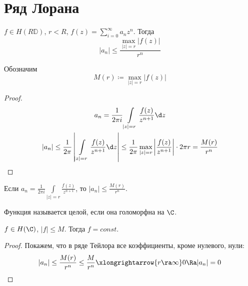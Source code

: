 \section{Ряд Лорана}

\begin{theorem}
	$f \in H(R\mathbb D)$, $r < R$, $f(z) = \sum_{i=0}^\infty a_nz^n$.
	Тогда
	\[ |a_n| \le \frac{\max_{|z| = r} |f(z)|}{r^n} \]
\end{theorem}

Обозначим
\[ M(r) \coloneqq \max_{|z| = r} |f(z)| \]
\begin{proof}
	\begin{gather*}
		a_n = \frac1{2\pi i} \int\limits_{|z| = r} \frac{f(z)}{z^{n+1}} \d z \\
		|a_n|
		\le \frac1{2\pi} \left| \int\limits_{|z| = r} \frac{f(z)}{z^{n+1}} \d z\right|
		\le \frac1{2\pi} \max_{|z| = r} \left| \frac{f(z)}{z^{n+1}}\right| \cdot 2\pi r = \frac{M(r)}{r^n}
	\end{gather*}
\end{proof}

\begin{Rem}
	Если $a_n = \frac1{2\pi i} \int\limits_{|z| = r} \frac{f(z)}{z^{n+1}}$, то $|a_n| \le \frac{M(r)}{r^n}$.
\end{Rem}

\begin{Def}
	Функция называется целой, если она голоморфна на $\C$.
\end{Def}

\begin{theorem}[Лиувилля]
	$f \in H(\C)$, $|f| \le M$.
	Тогда $f = const$.
\end{theorem}
\begin{proof}
	Покажем, что в ряде Тейлора все коэффициенты, кроме нулевого, нули:
	\[ |a_n| \le \frac{M(r)}{r^n} \le \frac M{r^n} \xlongrightarrow{r \ra \infty} 0 \Ra |a_n| = 0 \]
\end{proof}

